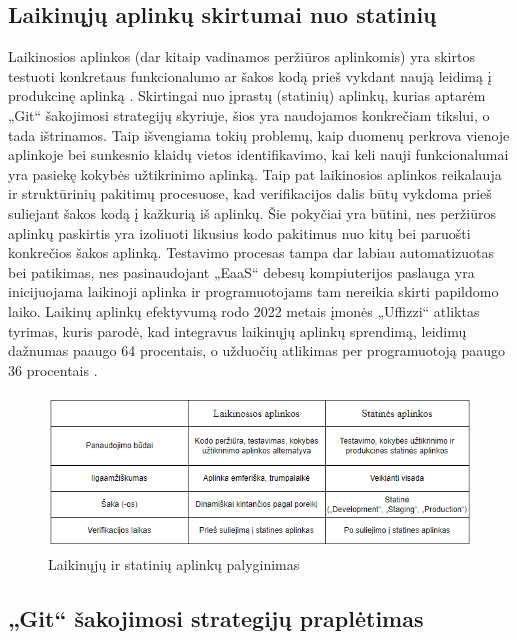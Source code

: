 \documentclass{VUMIFPSkursinis}
\begin{document}
\subsection{Laikinųjų aplinkų skirtumai nuo statinių}

Laikinosios aplinkos (dar kitaip vadinamos peržiūros aplinkomis) yra skirtos testuoti konkretaus funkcionalumo ar šakos kodą prieš vykdant naują leidimą į produkcinę aplinką \cite{SaltVienuoliktas}. Skirtingai nuo įprastų (statinių) aplinkų, kurias aptarėm „Git“ šakojimosi strategijų skyriuje, šios yra naudojamos konkrečiam tikslui, o tada ištrinamos. Taip išvengiama tokių problemų, kaip duomenų perkrova vienoje aplinkoje bei sunkesnio klaidų vietos identifikavimo, kai keli nauji funkcionalumai yra pasiekę kokybės užtikrinimo aplinką. Taip pat laikinosios aplinkos reikalauja ir struktūrinių pakitimų procesuose, kad verifikacijos dalis būtų vykdoma prieš suliejant šakos kodą į kažkurią iš aplinkų. Šie pokyčiai yra būtini, nes peržiūros aplinkų paskirtis yra izoliuoti likusius kodo pakitimus nuo kitų bei paruošti konkrečios šakos aplinką. Testavimo procesas tampa dar labiau automatizuotas bei patikimas, nes pasinaudojant „EaaS“ debesų kompiuterijos paslauga yra inicijuojama laikinoji aplinka ir programuotojams tam nereikia skirti papildomo laiko. Laikinų aplinkų efektyvumą rodo 2022 metais įmonės „Uffizzi“ atliktas tyrimas, kuris parodė, kad integravus laikinųjų aplinkų sprendimą, leidimų dažnumas paaugo 64 procentais, o užduočių atlikimas per programuotoją paaugo 36 procentais \cite{SaltDvyliktas}.

\begin{figure}[H]
    \centering
    \includegraphics[scale=0.9]{img/LaikinosVsStatines.png}
    \caption{Laikinųjų ir statinių aplinkų palyginimas}
    \label{img:mlp}
\end{figure}

\subsection{„Git“ šakojimosi strategijų praplėtimas}
\end{document}
